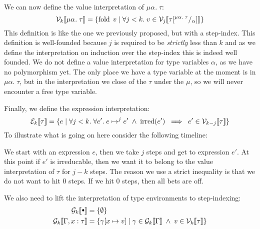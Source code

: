 We can now define the value interpretation of $\mu\alpha. \; \tau$:
\[
  \vpres{\mu\alpha.\; \tau} = \{\fold \; v \vbar \forall j < k. \; v \in \vpres[j]{\sub{\tau}{\mu\alpha.\;\tau}{\alpha}} \}
\]
This definition is like the one we previously proposed, but with a step-index. This definition is well-founded because $j$ is required to be \emph{strictly} less than $k$ and as we define the interpretation on induction over the step-index this is indeed well founded. We do not define a value interpretation for type variables $\alpha$, as we have no polymorphism yet. The only place we have a type variable at the moment is in $\mu\alpha. \; \tau$, but in the interpretation we close of the $\tau$ under the $\mu$, so we will never encounter a free type variable.

Finally, we define the expression interpretation:
\[
  \epres{\tau} = \{e \vbar \forall j < k. \; \forall e'. \; e \evaltos[j] e' \pand \irred(e') \; \implies \; e' \in \vpres[k-j]{\tau}\}
\]
To illustrate what is going on here consider the following timeline: \\
\begin{center}
\end{center}
We start with an expression $e$, then we take $j$ steps and get to expression $e'$. At this point if $e'$ is irreducable, then we want it to belong to the value interpretation of $\tau$ for $j-k$ steps. The reason we use a strict inequality is that we do not want to hit 0 steps. If we hit 0 steps, then all bets are off.%

We also need to lift the interpretation of type environments to step-indexing:
\begin{align*}
  \gpres{\mtenv} & = \{\emptyset \} \\
  \gpres{\Gamma, x : \tau} & = \{ \gamma[x \mapsto v] \vbar \gamma \in \gpres{\Gamma} \pand v \in \vpres{\tau} \}
\end{align*}

